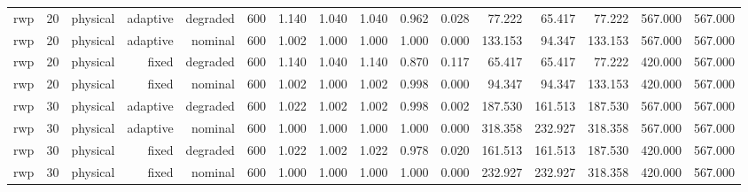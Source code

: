 \begin{tabular}{lrrrrrrrrrrrrrrr}
rwp & 20 & physical & adaptive & degraded & 600 & 1.140 & 1.040 & 1.040 & 0.962 & 0.028 & 77.222 & 65.417 & 77.222 & 567.000 & 567.000 \\
rwp & 20 & physical & adaptive & nominal & 600 & 1.002 & 1.000 & 1.000 & 1.000 & 0.000 & 133.153 & 94.347 & 133.153 & 567.000 & 567.000 \\
rwp & 20 & physical & fixed & degraded & 600 & 1.140 & 1.040 & 1.140 & 0.870 & 0.117 & 65.417 & 65.417 & 77.222 & 420.000 & 567.000 \\
rwp & 20 & physical & fixed & nominal & 600 & 1.002 & 1.000 & 1.002 & 0.998 & 0.000 & 94.347 & 94.347 & 133.153 & 420.000 & 567.000 \\
rwp & 30 & physical & adaptive & degraded & 600 & 1.022 & 1.002 & 1.002 & 0.998 & 0.002 & 187.530 & 161.513 & 187.530 & 567.000 & 567.000 \\
rwp & 30 & physical & adaptive & nominal & 600 & 1.000 & 1.000 & 1.000 & 1.000 & 0.000 & 318.358 & 232.927 & 318.358 & 567.000 & 567.000 \\
rwp & 30 & physical & fixed & degraded & 600 & 1.022 & 1.002 & 1.022 & 0.978 & 0.020 & 161.513 & 161.513 & 187.530 & 420.000 & 567.000 \\
rwp & 30 & physical & fixed & nominal & 600 & 1.000 & 1.000 & 1.000 & 1.000 & 0.000 & 232.927 & 232.927 & 318.358 & 420.000 & 567.000 \\
\bottomrule
\end{tabular}